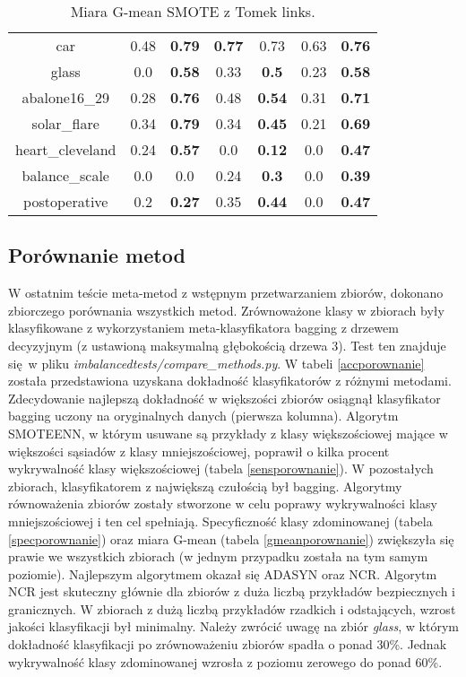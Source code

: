 \begin{table}[H]
\begin{center}
{\begin{tabular}{c|cccccc}
					car&0.48&\textbf{0.79}&\textbf{0.77}&0.73&0.63&\textbf{0.76}\\%
					glass&0.0&\textbf{0.58}&0.33&\textbf{0.5}&0.23&\textbf{0.58}\\%
					abalone16\_29&0.28&\textbf{0.76}&0.48&\textbf{0.54}&0.31&\textbf{0.71}\\%
					solar\_flare&0.34&\textbf{0.79}&0.34&\textbf{0.45}&0.21&\textbf{0.69}\\%
					heart\_cleveland&0.24&\textbf{0.57}&0.0&\textbf{0.12}&0.0&\textbf{0.47}\\%
					balance\_scale&0.0&0.0&0.24&\textbf{0.3}&0.0&\textbf{0.39}\\%
					postoperative&0.2&\textbf{0.27}&0.35&\textbf{0.44}&0.0&\textbf{0.47}\\%
				\end{tabular}}
				\caption{Miara G-mean SMOTE z Tomek links.}
				\label{gmeansmotetomek}
			\end{center}
		\end{table}		
					
\subsection{Porównanie metod}
W ostatnim teście meta-metod z wstępnym przetwarzaniem zbiorów, dokonano zbiorczego porównania wszystkich metod. Zrównoważone klasy w zbiorach były klasyfikowane z wykorzystaniem meta-klasyfikatora bagging z drzewem decyzyjnym (z ustawioną maksymalną głębokością drzewa 3). Test ten znajduje się w pliku \textit{imbalancedtests/compare\_methods.py}. W tabeli \ref{accporownanie} została przedstawiona uzyskana dokładność klasyfikatorów z różnymi metodami. Zdecydowanie najlepszą dokładność w większości zbiorów osiągnął klasyfikator bagging uczony na oryginalnych danych (pierwsza kolumna). Algorytm SMOTEENN, w którym usuwane są przykłady z klasy większościowej mające w większości sąsiadów z klasy mniejszościowej, poprawił o kilka procent wykrywalność klasy większościowej (tabela \ref{sensporownanie}). W pozostałych zbiorach, klasyfikatorem z największą czułością był bagging. Algorytmy równoważenia zbiorów zostały stworzone w celu poprawy wykrywalności klasy mniejszościowej i ten cel spełniają. Specyficzność klasy zdominowanej (tabela \ref{specporownanie}) oraz miara G-mean (tabela \ref{gmeanporownanie}) zwiększyła się prawie we wszystkich zbiorach (w jednym przypadku została na tym samym poziomie). Najlepszym algorytmem okazał się ADASYN oraz NCR. Algorytm NCR jest skuteczny głównie dla zbiorów z duża liczbą przykładów bezpiecznych i granicznych. W zbiorach z dużą liczbą przykładów rzadkich i odstających, wzrost jakości klasyfikacji był minimalny. Należy zwrócić uwagę na zbiór \textit{glass}, w którym dokładność klasyfikacji po zrównoważeniu zbiorów spadła o ponad 30\%. Jednak wykrywalność klasy zdominowanej wzrosła z poziomu zerowego do ponad 60\%. 

